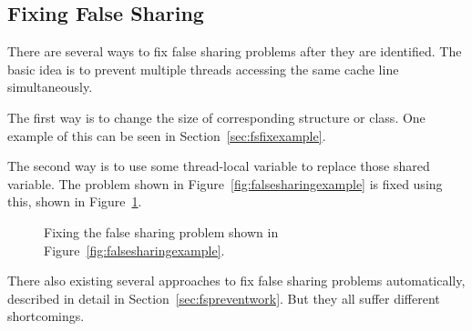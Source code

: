 \subsection{Fixing False Sharing}
There are several ways to fix false sharing problems after they are identified. The basic idea is to prevent multiple threads accessing the same cache line simultaneously.  

The first way is to change the size of corresponding structure or class. One example of this can be seen in Section~\ref{sec:fsfixexample}.

The second way is to use some thread-local variable to replace those shared variable.
The problem shown in Figure~\ref{fig:falsesharingexample} is fixed using this, shown in Figure~\ref{fig:falsesharingexamplefix}. 

\begin{figure}[!ht]
{\centering
\fbox{
\subfigure{}
}
\caption{Fixing the false sharing problem shown in Figure~\ref{fig:falsesharingexample}.
\label{fig:falsesharingexamplefix}}
}
\end{figure}

There also existing several approaches to fix false sharing problems automatically, described in detail in Section~\ref{sec:fspreventwork}. But they all suffer different shortcomings. 




